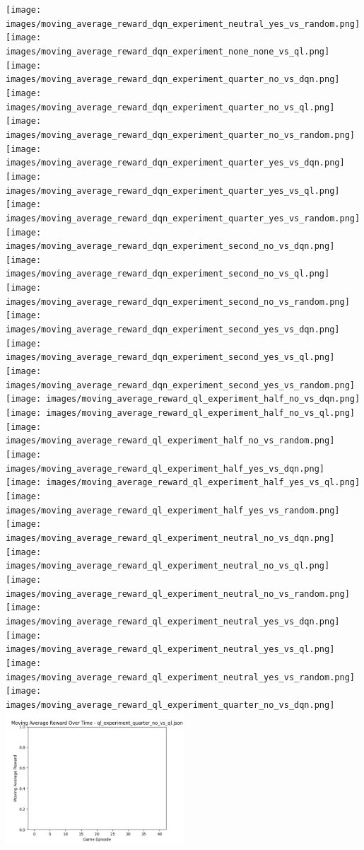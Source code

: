 \texttt{[image: images/moving\_average\_reward\_dqn\_experiment\_neutral\_yes\_vs\_random.png]} 
\texttt{[image: images/moving\_average\_reward\_dqn\_experiment\_none\_none\_vs\_ql.png]} 
\texttt{[image: images/moving\_average\_reward\_dqn\_experiment\_quarter\_no\_vs\_dqn.png]} 
\texttt{[image: images/moving\_average\_reward\_dqn\_experiment\_quarter\_no\_vs\_ql.png]} 
\texttt{[image: images/moving\_average\_reward\_dqn\_experiment\_quarter\_no\_vs\_random.png]} 
\texttt{[image: images/moving\_average\_reward\_dqn\_experiment\_quarter\_yes\_vs\_dqn.png]} 
\texttt{[image: images/moving\_average\_reward\_dqn\_experiment\_quarter\_yes\_vs\_ql.png]} 
\texttt{[image: images/moving\_average\_reward\_dqn\_experiment\_quarter\_yes\_vs\_random.png]} 
\texttt{[image: images/moving\_average\_reward\_dqn\_experiment\_second\_no\_vs\_dqn.png]} 
\texttt{[image: images/moving\_average\_reward\_dqn\_experiment\_second\_no\_vs\_ql.png]} 
\texttt{[image: images/moving\_average\_reward\_dqn\_experiment\_second\_no\_vs\_random.png]} 
\texttt{[image: images/moving\_average\_reward\_dqn\_experiment\_second\_yes\_vs\_dqn.png]} 
\texttt{[image: images/moving\_average\_reward\_dqn\_experiment\_second\_yes\_vs\_ql.png]} 
\texttt{[image: images/moving\_average\_reward\_dqn\_experiment\_second\_yes\_vs\_random.png]} 
\texttt{[image: images/moving\_average\_reward\_ql\_experiment\_half\_no\_vs\_dqn.png]} 
\texttt{[image: images/moving\_average\_reward\_ql\_experiment\_half\_no\_vs\_ql.png]} 
\texttt{[image: images/moving\_average\_reward\_ql\_experiment\_half\_no\_vs\_random.png]} 
\texttt{[image: images/moving\_average\_reward\_ql\_experiment\_half\_yes\_vs\_dqn.png]} 
\texttt{[image: images/moving\_average\_reward\_ql\_experiment\_half\_yes\_vs\_ql.png]} 
\texttt{[image: images/moving\_average\_reward\_ql\_experiment\_half\_yes\_vs\_random.png]} 
\texttt{[image: images/moving\_average\_reward\_ql\_experiment\_neutral\_no\_vs\_dqn.png]} 
\texttt{[image: images/moving\_average\_reward\_ql\_experiment\_neutral\_no\_vs\_ql.png]} 
\texttt{[image: images/moving\_average\_reward\_ql\_experiment\_neutral\_no\_vs\_random.png]} 
\texttt{[image: images/moving\_average\_reward\_ql\_experiment\_neutral\_yes\_vs\_dqn.png]} 
\texttt{[image: images/moving\_average\_reward\_ql\_experiment\_neutral\_yes\_vs\_ql.png]} 
\texttt{[image: images/moving\_average\_reward\_ql\_experiment\_neutral\_yes\_vs\_random.png]} 
\texttt{[image: images/moving\_average\_reward\_ql\_experiment\_quarter\_no\_vs\_dqn.png]} 
\includegraphics[width=0.5\textwidth]{images/moving_average_reward_ql_experiment_quarter_no_vs_ql.png} 

